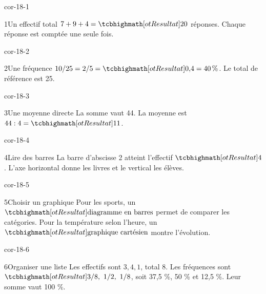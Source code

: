 \clearpage\pagestyle{otMain}\setlength{\otBlocEspacement}{2.5mm}\fontsize{11}{15}\selectfont{}
\begin{blocLivre}{cor-18-1}\begin{corrige}{1}{Un effectif total}
$7+9+4=\res{20}$ réponses. Chaque réponse est comptée une seule fois.
\end{corrige}\end{blocLivre}
\begin{blocLivre}{cor-18-2}\begin{corrige}{2}{Une fréquence}
$10/25=2/5=\res{0{,}4=40\,\%}$. Le total de référence est 25.
\end{corrige}\end{blocLivre}
\begin{blocLivre}{cor-18-3}\begin{corrige}{3}{Une moyenne directe}
La somme vaut 44. La moyenne est $44:4=\res{11}$.
\end{corrige}\end{blocLivre}
\begin{blocLivre}{cor-18-4}\begin{corrige}{4}{Lire des barres}
La barre d’abscisse 2 atteint l’effectif $\res4$. L’axe horizontal donne les livres et le vertical les élèves.
\label{fig-cor-18-4}
\end{corrige}\end{blocLivre}
\begin{blocLivre}{cor-18-5}\begin{corrige}{5}{Choisir un graphique}
Pour les sports, un $\res{\text{diagramme en barres}}$ permet de comparer les catégories. Pour la température selon l’heure, un $\res{\text{graphique cartésien}}$ montre l’évolution.
\end{corrige}\end{blocLivre}
\begin{blocLivre}{cor-18-6}\begin{corrige}{6}{Organiser une liste}
Les effectifs sont $3,4,1$, total 8. Les fréquences sont $\res{3/8,\ 1/2,\ 1/8}$, soit 37,5 \%, 50 \% et 12,5 \%. Leur somme vaut 100 \%.
\end{corrige}\end{blocLivre}

